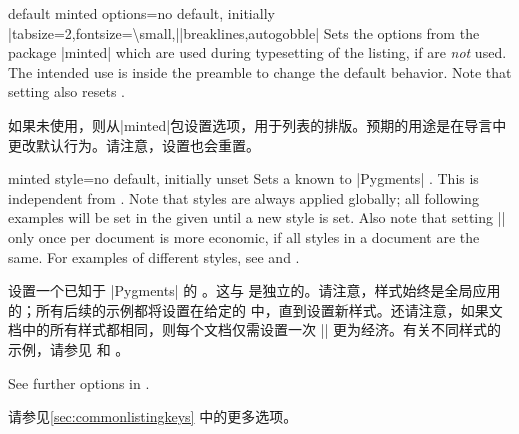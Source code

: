 \begin{docTcbKey}[][doc new={2021-12-15}]{default minted options}{=}{no default, initially
|tabsize=2,fontsize=\textbackslash small,|\linebreak|breaklines,autogobble|}
Sets the options from the package |minted| \cite{poore:minted}
which are used during typesetting of the listing, if
 are \emph{not} used. The intended use is
inside the preamble to change the default behavior.
Note that setting  also resets .

如果未使用，则从|minted|\cite{poore:minted}包设置选项，用于列表的排版。预期的用途是在导言中更改默认行为。请注意，设置也会重置。
\begin{dispListing}
\end{dispListing}
\end{docTcbKey}



\begin{docTcbKey}{minted style}{=}{no default, initially unset}
Sets a  known to |Pygments| \cite{pygments:web}. This is
independent from . Note that styles are always
applied globally; all following examples will be set in the given 
until a new style is set. Also note that
setting |\usemintedstyle| only once per document is more economic, if
all styles in a document are the same.
For examples of different styles, see
 and .

设置一个已知于 |Pygments| \cite{pygments:web} 的 。这与  是独立的。请注意，样式始终是全局应用的；所有后续的示例都将设置在给定的  中，直到设置新样式。还请注意，如果文档中的所有样式都相同，则每个文档仅需设置一次 |\usemintedstyle| 更为经济。有关不同样式的示例，请参见  和 。
\end{docTcbKey}

See further options in .

请参见\ref{sec:commonlistingkeys} 中的更多选项。